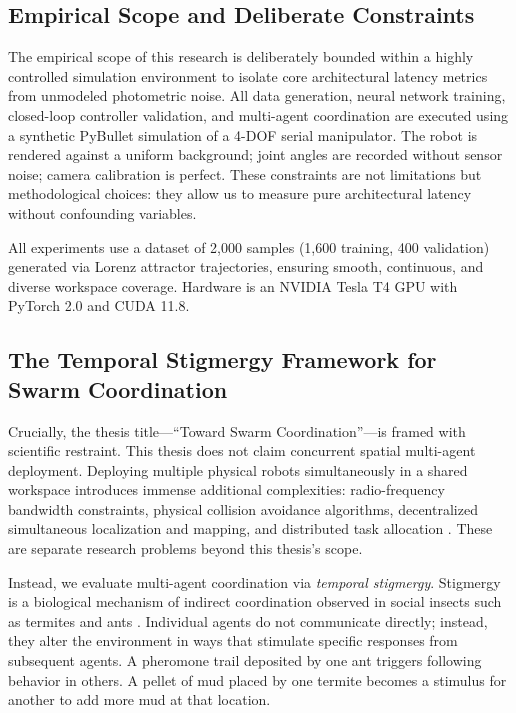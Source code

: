 \documentclass[12pt,a4paper,oneside]{report}
\begin{document}
\subsection{Empirical Scope and Deliberate Constraints}
\label{subsec:empirical_scope}

The empirical scope of this research is deliberately bounded within a highly controlled simulation environment to isolate core architectural latency metrics from unmodeled photometric noise. All data generation, neural network training, closed-loop controller validation, and multi-agent coordination are executed using a synthetic PyBullet simulation of a 4-DOF serial manipulator. The robot is rendered against a uniform background; joint angles are recorded without sensor noise; camera calibration is perfect. These constraints are not limitations but methodological choices: they allow us to measure pure architectural latency without confounding variables.

All experiments use a dataset of 2,000 samples (1,600 training, 400 validation) generated via Lorenz attractor trajectories, ensuring smooth, continuous, and diverse workspace coverage. Hardware is an NVIDIA Tesla T4 GPU with PyTorch 2.0 and CUDA 11.8.

\subsection{The Temporal Stigmergy Framework for Swarm Coordination}
\label{subsec:temporal_stigmergy_framework}

Crucially, the thesis title—``Toward Swarm Coordination''—is framed with scientific restraint. This thesis does not claim concurrent spatial multi-agent deployment. Deploying multiple physical robots simultaneously in a shared workspace introduces immense additional complexities: radio-frequency bandwidth constraints, physical collision avoidance algorithms, decentralized simultaneous localization and mapping, and distributed task allocation \cite{matsuki2024gaussian, keetha2024splattam}. These are separate research problems beyond this thesis's scope.

Instead, we evaluate multi-agent coordination via \textit{temporal stigmergy}. Stigmergy is a biological mechanism of indirect coordination observed in social insects such as termites and ants \cite{bongard2006resilient}. Individual agents do not communicate directly; instead, they alter the environment in ways that stimulate specific responses from subsequent agents. A pheromone trail deposited by one ant triggers following behavior in others. A pellet of mud placed by one termite becomes a stimulus for another to add more mud at that location.
\end{document}

